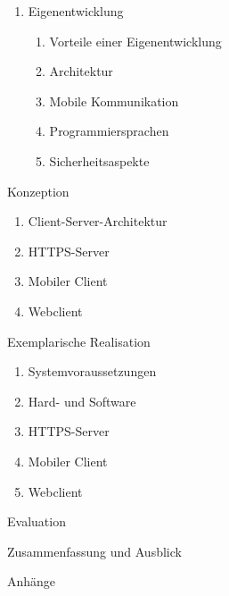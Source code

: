 \begin{enumerate}[
    labelindent=*,
    leftmargin=\widthof{\textbf{Kapitel~0:~}},
    label=\arabic*.
  ]
{\begin{enumerate}[label=\theenumi\arabic*.]
\begin{enumerate}[label=\theenumi\arabic*.]
              \end{enumerate}
            \item Eigenentwicklung
              \begin{enumerate}[label=\theenumi\arabic*.]
                  \item Vorteile einer Eigenentwicklung
                  \item Architektur
                  \item Mobile Kommunikation
                  \item Programmiersprachen
                  \item Sicherheitsaspekte
              \end{enumerate}
        \end{enumerate}
      \setcounter{enumi}{4}
      \item[\textbf{Kapitel~\arabic{enumi}:}]
        Konzeption
        \begin{enumerate}[label=\theenumi\arabic*.]
            \item Client-Server-Architektur
            \item HTTPS-Server
            \item Mobiler Client
            \item Webclient
        \end{enumerate}
      \setcounter{enumi}{5}
      \item[\textbf{Kapitel~\arabic{enumi}:}]
        Exemplarische Realisation
        \begin{enumerate}[label=\theenumi\arabic*.]
            \item Systemvoraussetzungen
            \item Hard- und Software
            \item HTTPS-Server
            \item Mobiler Client
            \item Webclient
        \end{enumerate}
      }
    \setcounter{enumi}{6}
    \item[\textbf{Kapitel~\arabic{enumi}:}]
      Evaluation
    \setcounter{enumi}{7}
    \item[\textbf{Kapitel~\arabic{enumi}:}]
      Zusammenfassung und Ausblick
    \item[]
      Anhänge

  \end{enumerate}


